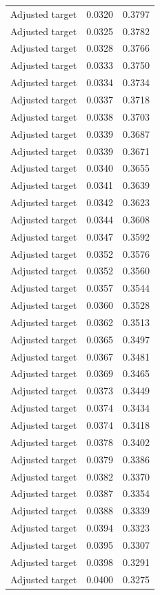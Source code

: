 \begin{table}[htbp]
\begin{tabular}{lll}
Adjusted target & 0.0320 & 0.3797 \\
Adjusted target & 0.0325 & 0.3782 \\
Adjusted target & 0.0328 & 0.3766 \\
Adjusted target & 0.0333 & 0.3750 \\
Adjusted target & 0.0334 & 0.3734 \\
Adjusted target & 0.0337 & 0.3718 \\
Adjusted target & 0.0338 & 0.3703 \\
Adjusted target & 0.0339 & 0.3687 \\
Adjusted target & 0.0339 & 0.3671 \\
Adjusted target & 0.0340 & 0.3655 \\
Adjusted target & 0.0341 & 0.3639 \\
Adjusted target & 0.0342 & 0.3623 \\
Adjusted target & 0.0344 & 0.3608 \\
Adjusted target & 0.0347 & 0.3592 \\
Adjusted target & 0.0352 & 0.3576 \\
Adjusted target & 0.0352 & 0.3560 \\
Adjusted target & 0.0357 & 0.3544 \\
Adjusted target & 0.0360 & 0.3528 \\
Adjusted target & 0.0362 & 0.3513 \\
Adjusted target & 0.0365 & 0.3497 \\
Adjusted target & 0.0367 & 0.3481 \\
Adjusted target & 0.0369 & 0.3465 \\
Adjusted target & 0.0373 & 0.3449 \\
Adjusted target & 0.0374 & 0.3434 \\
Adjusted target & 0.0374 & 0.3418 \\
Adjusted target & 0.0378 & 0.3402 \\
Adjusted target & 0.0379 & 0.3386 \\
Adjusted target & 0.0382 & 0.3370 \\
Adjusted target & 0.0387 & 0.3354 \\
Adjusted target & 0.0388 & 0.3339 \\
Adjusted target & 0.0394 & 0.3323 \\
Adjusted target & 0.0395 & 0.3307 \\
Adjusted target & 0.0398 & 0.3291 \\
Adjusted target & 0.0400 & 0.3275 \\

\end{tabular}
\end{table}
